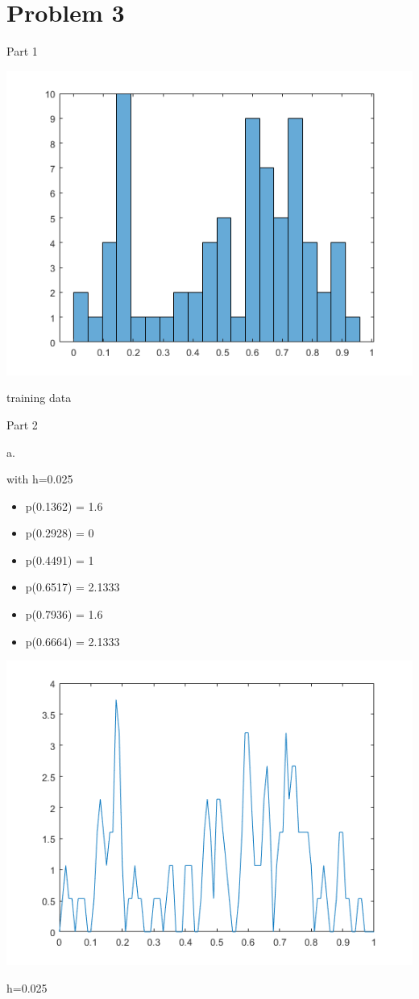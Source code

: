\documentclass[a4paper]{article}
\begin{document}
\section{Problem 3}

Part 1
\begin{center}
    \includegraphics[scale=1]{3-1.png}
    \caption{training data}
\end{center}

\noindent
Part 2

\noindent
a.

\noindent
with h=0.025
\begin{itemize}
    \item p(0.1362) = 1.6
    \item p(0.2928) = 0
    \item p(0.4491) = 1
    \item p(0.6517) = 2.1333
    \item p(0.7936) = 1.6
    \item p(0.6664) = 2.1333
\end{itemize}

\begin{center}
    \includegraphics[scale=1]{3a.png}
    \caption{h=0.025}
\end{center}
\end{document}
